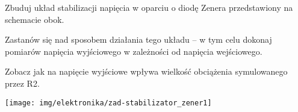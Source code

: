 \dbEntryCheckResults
\noindent\begin{minipage}[b]{0.77\textwidth}
Zbuduj układ stabilizacji napięcia w oparciu o diodę Zenera przedstawiony na schemacie obok.

Zastanów się nad sposobem działania tego układu – w tym celu dokonaj pomiarów napięcia wyjściowego w zależności od napięcia wejściowego.

Zobacz jak na napięcie wyjściowe wpływa wielkość obciążenia symulowanego przez R2.
\vspace{13pt}
\end{minipage}
\hfill
\begin{minipage}[b]{0.17\textwidth}
\texttt{[image: img/elektronika/zad-stabilizator\_zener1]}
\end{minipage}
\fi
